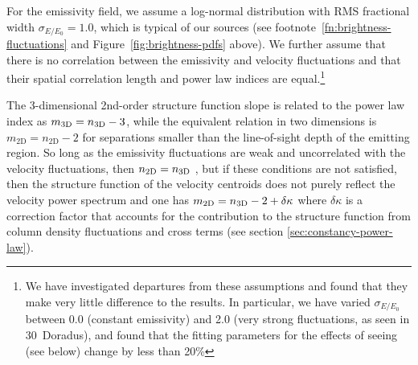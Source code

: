 \documentclass[fleqn,usenatbib, useAMS, a4paper]{mnras}
\newcommand\startNEW{\color{black}}
\newcommand\stopNEW{\color{black}}
\newcommand\shortsig[1]{\ensuremath{\sigma_{#1/#1_0}}}
\begin{document}
For the emissivity field, we assume a log-normal distribution
with RMS fractional width
\(\shortsig{E} = 1.0\), which is typical of our sources
(see footnote~\ref{fn:brightness-fluctuations} and Figure~\ref{fig:brightness-pdfs} above).
We further assume that there is no correlation between the emissivity
and velocity fluctuations and that their spatial correlation length
and power law indices are equal.\footnote{%
  \startNEW
  We have investigated departures from these assumptions and found that they
  make very little difference to the results.
  In particular, we have varied \(\shortsig{E}\) between
  0.0 (constant emissivity) and 2.0 (very strong fluctuations,
  as seen in 30~Doradus), and found that the fitting parameters
  for the effects of seeing (see below) change by less than 20\%
  \stopNEW
}

\newcommand\DD{\ensuremath{_{\mathrm{2D}}}}
The 3-dimensional 2nd-order structure function slope is related to the power law index as \(m_{\mathrm{3D}} = n_{\mathrm{3D}} - 3\), while the equivalent relation in two dimensions is \(m\DD = n\DD - 2\) for separations smaller than the line-of-sight
depth of the emitting region.
So long as the emissivity fluctuations are weak
and uncorrelated with the velocity fluctuations, then \(n\DD = n\DDD\)
\citep{Miville-Deschenes:2003a, Levrier:2004a},
but if these conditions are not satisfied, then the structure function
of the velocity centroids does not purely reflect the velocity power spectrum
\citep{Brunt:2004a, Esquivel:2005a, Ossenkopf:2006a, Esquivel:2007b}
and one has \(m\DD = n\DDD - 2 + \delta\kappa\) where \(\delta\kappa\) is a correction factor
that accounts for the contribution to the structure function from
column density fluctuations and cross terms (see section \ref{sec:constancy-power-law}).
\end{document}
